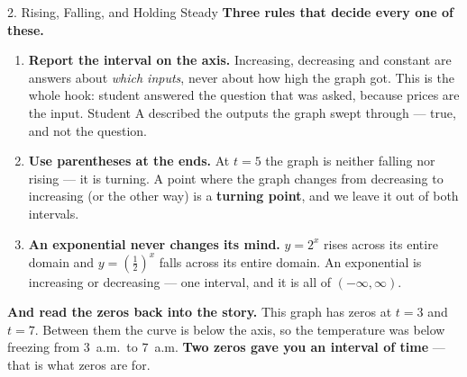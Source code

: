 \documentclass[10pt]{article}
\begin{document}
\begin{notesbox}{2. Rising, Falling, and Holding Steady}
\vspace{6pt}
\textbf{Three rules that decide every one of these.}
\begin{enumerate}[leftmargin=1.5em, itemsep=3pt, topsep=3pt]
  \item \textbf{Report the interval on the \blank{2.6cm} axis.} Increasing, decreasing and constant
        are answers about \emph{which inputs}, never about how high the graph got. This is the whole
        hook: student \blank{0.9cm} answered the question that was asked, because prices are the
        input. Student A described the outputs the graph swept through --- true, and not the
        question.
  \item \textbf{Use parentheses at the ends.} At $t=5$ the graph is neither falling nor rising --- it
        is turning. A point where the graph changes from decreasing to increasing (or the other way)
        is a \textbf{turning point}, and we leave it out of both intervals.
  \item \textbf{An exponential never changes its mind.} $y=2^x$ rises across its entire domain and
        $y=\left(\tfrac12\right)^x$ falls across its entire domain. An exponential is
        \blank{2.4cm} increasing or \blank{2.4cm} decreasing --- one interval, and it is all of
        $(-\infty,\infty)$.
\end{enumerate}

\vspace{4pt}
\textbf{And read the zeros back into the story.} This graph has zeros at $t=3$ and $t=7$. Between
them the curve is below the axis, so the temperature was below freezing from $3$~a.m.\ to
$7$~a.m. \textbf{Two zeros gave you an interval of time} --- that is what zeros are for.
\end{notesbox}

\vspace{0.10in}
\end{document}
